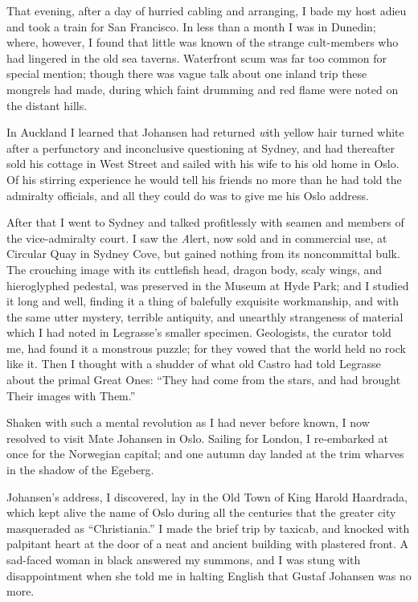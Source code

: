 That evening, after a day of hurried cabling and arranging, I bade my host adieu and took a train for San Francisco. In less than a month I was in Dunedin; where, however, I found that little was known of the strange cult-members who had lingered in the old sea taverns. Waterfront scum was far too common for special mention; though there was vague talk about one inland trip these mongrels had made, during which faint drumming and red flame were noted on the distant hills.

In Auckland I learned that Johansen had returned {\emph with yellow hair turned white} after a perfunctory and inconclusive questioning at Sydney, and had thereafter sold his cottage in West Street and sailed with his wife to his old home in Oslo. Of his stirring experience he would tell his friends no more than he had told the admiralty officials, and all they could do was to give me his Oslo address.

After that I went to Sydney and talked profitlessly with seamen and members of the vice-admiralty court. I saw the {\emph Alert}, now sold and in commercial use, at Circular Quay in Sydney Cove, but gained nothing from its noncommittal bulk. The crouching image with its cuttlefish head, dragon body, scaly wings, and hieroglyphed pedestal, was preserved in the Museum at Hyde Park; and I studied it long and well, finding it a thing of balefully exquisite workmanship, and with the same utter mystery, terrible antiquity, and unearthly strangeness of material which I had noted in Legrasse’s smaller specimen. Geologists, the curator told me, had found it a monstrous puzzle; for they vowed that the world held no rock like it. Then I thought with a shudder of what old Castro had told Legrasse about the primal Great Ones: “They had come from the stars, and had brought Their images with Them.”

Shaken with such a mental revolution as I had never before known, I now resolved to visit Mate Johansen in Oslo. Sailing for London, I re-embarked at once for the Norwegian capital; and one autumn day landed at the trim wharves in the shadow of the Egeberg.

Johansen’s address, I discovered, lay in the Old Town of King Harold Haardrada, which kept alive the name of Oslo during all the centuries that the greater city masqueraded as “Christiania.” I made the brief trip by taxicab, and knocked with palpitant heart at the door of a neat and ancient building with plastered front. A sad-faced woman in black answered my summons, and I was stung with disappointment when she told me in halting English that Gustaf Johansen was no more.

